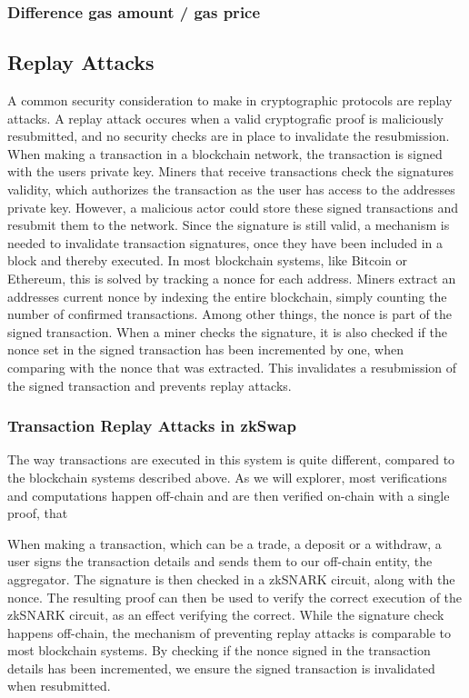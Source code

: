 \documentclass[../../thesis.tex]{subfiles}
\begin{document}
\subsubsection{Difference gas amount / gas price}

\subsection{Replay Attacks}
A common security consideration to make in cryptographic protocols are replay attacks. A replay attack occures when a valid cryptografic proof is maliciously resubmitted, and no security checks are in place to invalidate the resubmission. When making a transaction in a blockchain network, the transaction is signed with the users private key. Miners that receive transactions check the signatures validity, which authorizes the transaction as the user has access to the addresses private key. However, a malicious actor could store these signed transactions and resubmit them to the network. Since the signature is still valid, a mechanism is needed to invalidate transaction signatures, once they have been included in a block and thereby executed. In most blockchain systems, like Bitcoin or Ethereum, this is solved by tracking a nonce for each address. Miners extract an addresses current nonce by indexing the entire blockchain, simply counting the number of confirmed transactions. Among other things, the nonce is part of the signed transaction. When a miner checks the signature, it is also checked if the nonce set in the signed transaction has been incremented by one, when comparing with the nonce that was extracted. This invalidates a resubmission of the signed transaction and prevents replay attacks. 

\subsubsection{Transaction Replay Attacks in zkSwap}
The way transactions are executed in this system is quite different, compared to the blockchain systems described above. As we will explorer, most verifications and computations happen off-chain and are then verified on-chain with a single proof, that

When making a transaction, which can be a trade, a deposit or a withdraw, a user signs the transaction details and sends them to our off-chain entity, the aggregator. The signature is then checked in a zkSNARK circuit, along with the nonce. The resulting proof can then be used to verify the correct execution of the zkSNARK circuit, as an effect verifying the correct. While the signature check happens off-chain, the mechanism of preventing replay attacks is comparable to most blockchain systems. By checking if the nonce signed in the transaction details has been incremented, we ensure the signed transaction is invalidated when resubmitted. 
\end{document}
